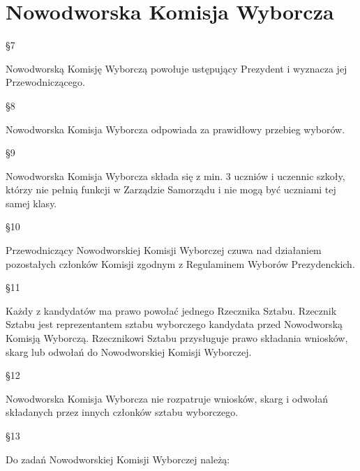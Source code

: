 \documentclass[12pt]{article}
\begin{document}
\section{Nowodworska Komisja Wyborcza}
    \begin{center}
        \S 7\\
    \end{center} 
    Nowodworską Komisję Wyborczą powołuje ustępujący Prezydent i wyznacza jej Przewodniczącego.\\
    \begin{center}
        \S 8\\
    \end{center} 
    Nowodworska Komisja Wyborcza odpowiada za prawidłowy przebieg wyborów.\\
    \begin{center}
        \S 9\\
    \end{center} 
    Nowodworska Komisja Wyborcza składa się z min. 3 uczniów i uczennic szkoły, którzy nie pełnią funkcji w Zarządzie Samorządu i nie mogą być uczniami tej samej klasy.\\
    \begin{center}
        \S 10\\
    \end{center} 
    Przewodniczący Nowodworskiej Komisji Wyborczej czuwa nad działaniem pozostałych członków Komisji zgodnym z Regulaminem Wyborów Prezydenckich.\\
    \begin{center}
        \S 11\\
    \end{center} 
    Każdy z kandydatów ma prawo powołać jednego Rzecznika Sztabu. Rzecznik Sztabu jest reprezentantem sztabu wyborczego kandydata przed Nowodworską Komisją Wyborczą.  Rzecznikowi  Sztabu przysługuje prawo składania wniosków, skarg lub odwołań do Nowodworskiej Komisji Wyborczej.\\
    \begin{center}
        \S 12\\
    \end{center} 
    Nowodworska Komisja Wyborcza nie rozpatruje wniosków, skarg i odwołań składanych przez innych członków sztabu wyborczego.\\
    \begin{center}
        \S 13\\
    \end{center} 
    Do zadań Nowodworskiej Komisji Wyborczej należą:
\end{document}
